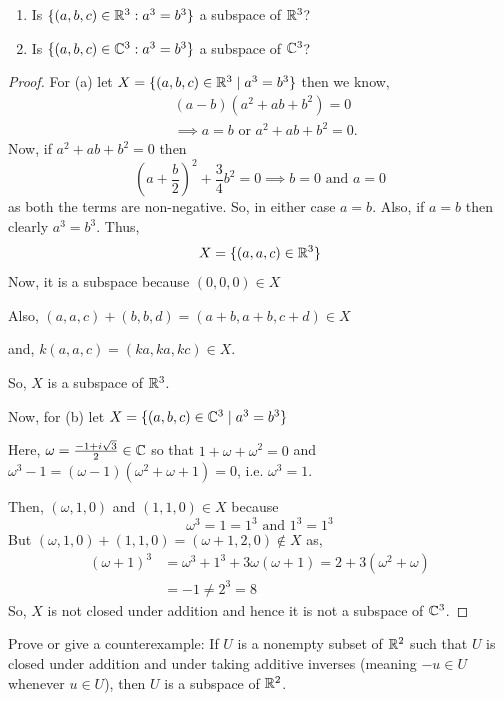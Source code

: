 \begin{exercise}
\begin{enumerate}
\item[(a)] Is $\{(a, b, c) \in \mathbb{R}^3 : a^3 = b^3\}$ a subspace of $\mathbb{R}^3$?
\item[(b)] Is $\{(a, b, c) \in \mathbb{C}^3 : a^3 = b^3\}$ a subspace of $\mathbb{C}^3$?
\end{enumerate}
\end{exercise}

\begin{proof}
For (a) let $X = \{(a,b,c) \in \mathbb{R}^3 \mid a^3 = b^3\}$ then we know,
\begin{align*}
& (a - b)(a^2 + ab + b^2) = 0 \\
& \implies a = b \text{ or } a^2 + ab + b^2 = 0.
\end{align*}
Now, if $a^2 + ab + b^2 = 0$ then
\[
\left(a + \frac{b}{2}\right)^2 + \frac{3}{4} b^2 = 0 \implies b = 0 \text{ and } a = 0
\]
as both the terms are non-negative. So, in either case $a = b$. Also, if $a = b$ then clearly $a^3 = b^3$. Thus,
\[
X = \{(a,a,c) \in \mathbb{R}^3\}
\]
Now, it is a subspace because $(0,0,0) \in X$

Also, $(a,a,c) + (b,b,d) = (a+b, a+b, c+d) \in X$

and, $k(a,a,c) = (ka, ka, kc) \in X$.

So, $X$ is a subspace of $\mathbb{R}^3$.

Now, for (b) let $X = \{(a,b,c) \in \mathbb{C}^3 \mid a^3 = b^3\}$

Here, $\omega = \frac{-1 + i\sqrt{3}}{2} \in \mathbb{C}$ so that $1 + \omega + \omega^2 = 0$ and $\omega^3 - 1 = (\omega - 1)(\omega^2 + \omega + 1) = 0$, i.e. $\omega^3 = 1$.

Then, $(\omega, 1, 0)$ and $(1, 1, 0) \in X$ because
\[
\omega^3 = 1 = 1^3 \text{ and } 1^3 = 1^3
\]
But $(\omega, 1, 0) + (1, 1, 0) = (\omega + 1, 2, 0) \notin X$ as,
\begin{align*}
(\omega + 1)^3 &= \omega^3 + 1^3 + 3\omega(\omega + 1) = 2 + 3(\omega^2 + \omega) \\
&= -1 \neq 2^3 = 8
\end{align*}
So, $X$ is not closed under addition and hence it is not a subspace of $\mathbb{C}^3$.
\end{proof}

\begin{exercise}
Prove or give a counterexample: If $U$ is a nonempty subset of $\mathbb{R}^2$ such that $U$ is closed under addition and under taking additive inverses (meaning $-u \in U$ whenever $u \in U$), then $U$ is a subspace of $\mathbb{R}^2$.
\end{exercise}

